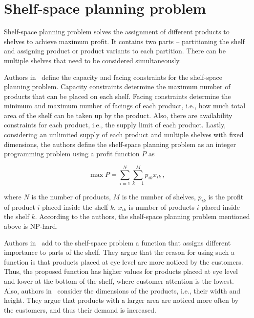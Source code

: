 \newpage
\section{Shelf-space planning problem}\label{sec:shelf-space-planning}

Shelf-space planning problem solves the assignment of different products to shelves to achieve maximum profit.
It contains two parts – partitioning the shelf and assigning product or product variants to each partition.
There can be multiple shelves that need to be considered simultaneously.~\cite{bianchi-aguiarRetailShelfSpace2021}

Authors in~\cite{yangStudyShelfSpace1999} define the capacity and facing constraints for the shelf-space planning problem.
Capacity constraints determine the maximum number of products that can be placed on each shelf.
Facing constraints determine the minimum and maximum number of facings of each product, i.e., how much total area of the shelf can be taken up by the product.
Also, there are availability constraints for each product, i.e., the supply limit of each product.
Lastly, considering an unlimited supply of each product and multiple shelves with fixed dimensions,
the authors define the shelf-space planning problem as an integer programming problem using a profit function $P$ as

\begin{equation}
    \max P = \sum\limits_{i=1}^N\sum\limits_{k=1}^Mp_{ik} x_{ik}\,,
    \label{eq:shelf-space-planning}
\end{equation}

where $N$ is the number of products, $M$ is the number of shelves, $p_{ik}$ is the profit of product $i$ placed inside the shelf $k$, $x_{ik}$
is number of products $i$ placed inside the shelf $k$.
According to the authors, the shelf-space planning problem mentioned above is NP-hard.

Authors in~\cite{hwangGeneticAlgorithmApproach2009} add to the shelf-space problem a function that assigns
different importance to parts of the shelf.
They argue that the reason for using such a function is that products placed at eye level are more noticed by the customers.
Thus, the proposed function has higher values for products placed at eye level and lower at the bottom of the shelf,
where customer attention is the lowest.
Also, authors in~\cite{hubnerMaximizingProfitAssortment2020} consider the dimensions of the products, i.e., their width and height.
They argue that products with a larger area are noticed more often by the customers, and thus their demand is increased.

